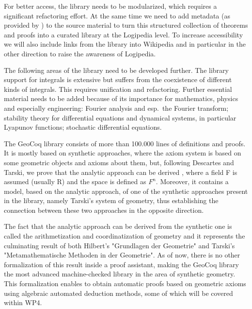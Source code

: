 \begin{workpackage}[id=libraries,wphases=0-48,type=RTD,
  short=Libraries,%
  title=Libraries,
  lead=Inr,
  InrRM=10,
  TumRM=39]
\begin{tasklist}
\begin{task}[id=isaAnalysisProb,title=The Isabelle Analysis \&
  Probability Theory library]
For better access, the library needs to be modularized, which requires
a significant refactoring effort.  At the same time we need to add
metadata (as provided by ) to the source material
to turn this structured collection of theorems and proofs into a
curated library at the Logipedia level. To increase accessibility
we will also include links from the library into Wikipedia and in
particular in the other direction to raise the awareness of Logipedia.

The following areas of the library need to be developed further. The
library support for integrals is extensive but suffers from the
coexistence of different kinds of integrals. This requires unification
and refactoring. Further essential material needs to be added because
of its importance for mathematics, physics and especially engineering: Fourier
analysis and esp.\ the Fourier transform; stability theory for
differential equations and dynamical systems, in particular Lyapunov
functions; stochastic differential equations.
\end{task}

\begin{task}[id=geocoq,title=The GeoCoq library]

The GeoCoq library consists of more than 100.000 lines of definitions and proofs. It is mostly based on synthetic approaches, where the axiom system is based on some geometric objects and axioms about them, but, following Descartes and Tarski, we prove that the analytic approach can be derived , where a field F is assumed (usually R) and the space is defined as $F^n$. Moreover, it contains a model, based on the analytic approach, of one of the synthetic approaches present in the library, namely Tarski's system of geometry, thus establishing the connection between these two approaches in the opposite direction.

The fact that the analytic approach can be derived from the synthetic one is called the arithmetization and coordinatization of geometry and it represents the culminating result of both Hilbert's "Grundlagen der Geometrie" and Tarski's "Metamathematische Methoden in der Geometrie". As of now, there is no other formalization of this result inside a proof assistant, making the GeoCoq library the most advanced machine-checked library in the area of synthetic geometry. This formalization enables to obtain automatic proofs based on geometric axioms using algebraic automated deduction methods, some of which will be covered within WP4.


\end{task}
\end{tasklist}
\end{workpackage}
